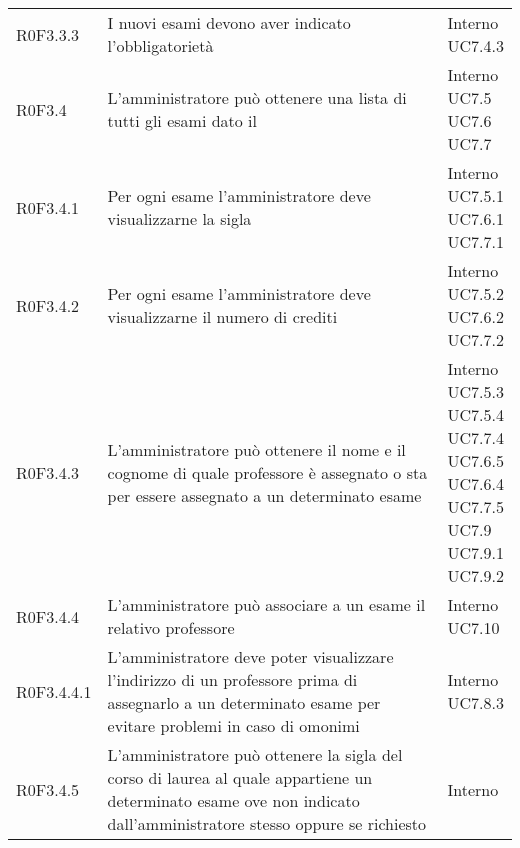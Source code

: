 \documentclass[AnalisiDeiRequisiti.tex]{subfiles}
\begin{document}
\begin{longtable}[H]{p{2cm}p{5.2cm}p{5cm}}
	R0F3.3.3 & I nuovi esami devono aver indicato l'obbligatorietà & \makecell[tl]{
		Interno \\ 
		UC7.4.3
	} \\
	R0F3.4 & L'amministratore può ottenere una lista di tutti gli esami dato il \citGloss{corso di laurea} & \makecell[tl]{
		Interno \\ 
		UC7.5 \\
		UC7.6 \\
		UC7.7
	} \\
	R0F3.4.1 & Per ogni esame l'amministratore deve visualizzarne la sigla & \makecell[tl]{
		Interno \\
		UC7.5.1 \\
		UC7.6.1 \\
		UC7.7.1
	} \\
	R0F3.4.2 & Per ogni esame l'amministratore deve visualizzarne il numero di crediti & \makecell[tl]{
		Interno \\
		UC7.5.2 \\
		UC7.6.2 \\
		UC7.7.2
	} \\
	R0F3.4.3 & L'amministratore può ottenere il nome e il cognome di quale professore è assegnato o sta per essere assegnato a un determinato esame & \makecell[tl]{
		Interno \\ 
		UC7.5.3 \\
		UC7.5.4 \\
		UC7.7.4 \\
		UC7.6.5 \\
		UC7.6.4 \\
		UC7.7.5 \\
		UC7.9 \\
		UC7.9.1 \\
		UC7.9.2
	} \\
	R0F3.4.4  & L'amministratore può associare a un esame il relativo professore & \makecell[tl]{
		Interno	 \\
		UC7.10 	
	} \\
	R0F3.4.4.1 & L'amministratore deve poter visualizzare l'indirizzo di un professore prima di assegnarlo a un determinato esame per evitare problemi in caso di omonimi & \makecell[tl]{
		Interno	 \\ 
		UC7.8.3 \\
	} \\
	R0F3.4.5 & L'amministratore può ottenere la sigla del corso di laurea al quale appartiene un determinato esame ove non indicato dall'amministratore stesso oppure se richiesto & \makecell[tl]{
		Interno	 \\ 
}
\end{longtable}
\end{document}
